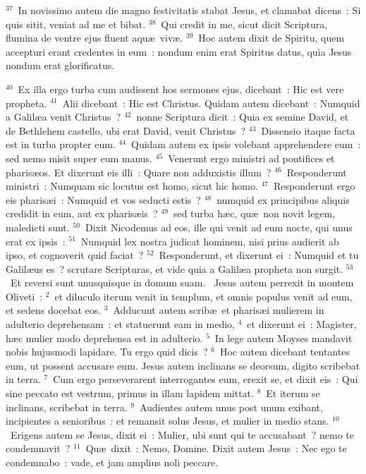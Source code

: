 ${}^{37}$~In novissimo autem die magno festivitatis stabat Jesus, et clamabat dicens~: Si quis sitit, veniat ad me et bibat.
${}^{38}$~Qui credit in me, sicut dicit Scriptura, flumina de ventre ejus fluent aqu\ae\ viv\ae .
${}^{39}$~Hoc autem dixit de Spiritu, quem accepturi erant credentes in eum~: nondum enim erat Spiritus datus, quia Jesus nondum erat glorificatus.


${}^{40}$~Ex illa ergo turba cum audissent hos sermones ejus, dicebant~: Hic est vere propheta.
${}^{41}$~Alii dicebant~: Hic est Christus. Quidam autem dicebant~: Numquid a Galil\ae a venit Christus~?
${}^{42}$~nonne Scriptura dicit~: Quia ex semine David, et de Bethlehem castello, ubi erat David, venit Christus~?
${}^{43}$~Dissensio itaque facta est in turba propter eum.
${}^{44}$~Quidam autem ex ipsis volebant apprehendere eum~: sed nemo misit super eum manus.
${}^{45}$~Venerunt ergo ministri ad pontifices et pharis\ae os. Et dixerunt eis illi~: Quare non adduxistis illum~?
${}^{46}$~Responderunt ministri~: Numquam sic locutus est homo, sicut hic homo.
${}^{47}$~Responderunt ergo eis pharis\ae i~: Numquid et vos seducti estis~?
${}^{48}$~numquid ex principibus aliquis credidit in eum, aut ex pharis\ae is~?
${}^{49}$~sed turba h\ae c, qu\ae\ non novit legem, maledicti sunt.
${}^{50}$~Dixit Nicodemus ad eos, ille qui venit ad eum nocte, qui unus erat ex ipsis~:
${}^{51}$~Numquid lex nostra judicat hominem, nisi prius audierit ab ipso, et cognoverit quid faciat~?
${}^{52}$~Responderunt, et dixerunt ei~: Numquid et tu Galil\ae us es~? scrutare Scripturas, et vide quia a Galil\ae a propheta non surgit.
${}^{53}$~Et reversi sunt unusquisque in domum suam.
~\lettrine[lines=10,image=true,loversize=0.05,lraise=-0.03]{J}{}esus autem perrexit in montem Oliveti~:
${}^{2}$~et diluculo iterum venit in templum, et omnis populus venit ad eum, et sedens docebat eos.
${}^{3}$~Adducunt autem scrib\ae\ et pharis\ae i mulierem in adulterio deprehensam~: et statuerunt eam in medio,
${}^{4}$~et dixerunt ei~: Magister, h\ae c mulier modo deprehensa est in adulterio.
${}^{5}$~In lege autem Moyses mandavit nobis hujusmodi lapidare. Tu ergo quid dicis~?
${}^{6}$~Hoc autem dicebant tentantes eum, ut possent accusare eum. Jesus autem inclinans se deorsum, digito scribebat in terra.
${}^{7}$~Cum ergo perseverarent interrogantes eum, erexit se, et dixit eis~: Qui sine peccato est vestrum, primus in illam lapidem mittat.
${}^{8}$~Et iterum se inclinans, scribebat in terra.
${}^{9}$~Audientes autem unus post unum exibant, incipientes a senioribus~: et remansit solus Jesus, et mulier in medio stans.
${}^{10}$~Erigens autem se Jesus, dixit ei~: Mulier, ubi sunt qui te accusabant~? nemo te condemnavit~?
${}^{11}$~Qu\ae\ dixit~: Nemo, Domine. Dixit autem Jesus~: Nec ego te condemnabo~: vade, et jam amplius noli peccare.


